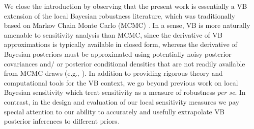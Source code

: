 We close the introduction by observing that  the present work is essentially a
VB extension of the local Bayesian robustness literature, which was
traditionally based on Markov Chain Monte Carlo (MCMC)
\citet{gustafson:1996:local, basu:1996:local}.  In a sense, VB is more naturally
amenable to sensitivity analysis than MCMC, since the derivative of VB
approximations is typically available in closed form, whereas the derivative of
Bayesian posteriors must be approximated using potentially noisy posterior
covariances and/ or posterior conditional densities that are not readily
available from MCMC draws (e.g., \citet{gustafson:1996:marginal}).  In addition
to providing rigorous theory and computational tools for the VB context, we go
beyond previous work on local Bayesian sensitivity which treat sensitivity as a
measure of robustness \textit{per se}.  In contrast, in the design and
evaluation of our local sensitivity measures we pay special attention to our
ability to accurately and usefully extrapolate VB posterior inferences to
different priors.




